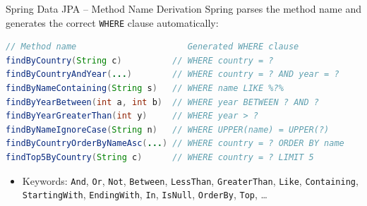 \begin{frame}[fragile]{Spring Data JPA -- Method Name Derivation}
  Spring parses the method name and generates the correct \texttt{WHERE} clause automatically:

  \begin{lstlisting}[style=sqlstyle, language=Java]
// Method name                      Generated WHERE clause
findByCountry(String c)          // WHERE country = ?
findByCountryAndYear(...)        // WHERE country = ? AND year = ?
findByNameContaining(String s)   // WHERE name LIKE %?%
findByYearBetween(int a, int b)  // WHERE year BETWEEN ? AND ?
findByYearGreaterThan(int y)     // WHERE year > ?
findByNameIgnoreCase(String n)   // WHERE UPPER(name) = UPPER(?)
findByCountryOrderByNameAsc(...) // WHERE country = ? ORDER BY name
findTop5ByCountry(String c)      // WHERE country = ? LIMIT 5
  \end{lstlisting}

  \begin{itemize}
    \item Keywords: \texttt{And}, \texttt{Or}, \texttt{Not}, \texttt{Between}, \texttt{LessThan},
          \texttt{GreaterThan}, \texttt{Like}, \texttt{Containing}, \texttt{StartingWith},
          \texttt{EndingWith}, \texttt{In}, \texttt{IsNull}, \texttt{OrderBy}, \texttt{Top}, \ldots
  \end{itemize}
\end{frame}
